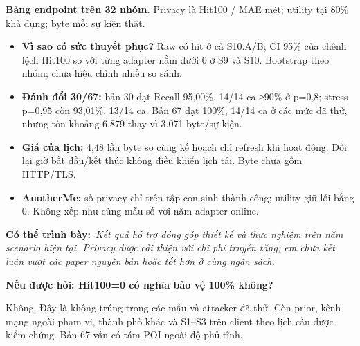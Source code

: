 \documentclass[10pt,a4paper]{article}
\newcommand{\say}[1]{\par\textbf{Có thể trình bày:}\ \textit{#1}\par}
\newcommand{\ask}[2]{\par\textbf{Nếu được hỏi: #1}\par #2\par}
\begin{document}
\textbf{Bảng endpoint trên 32 nhóm.} Privacy là Hit100 / MAE mét; utility tại 80\% khả dụng; byte mỗi sự kiện thật.
\EndpointEvidence
\begin{itemize}
\item \textbf{Vì sao có sức thuyết phục?} Raw có hit ở cả S10.A/B; CI 95\% của chênh lệch Hit100 so với từng adapter nằm dưới 0 ở S9 và S10. Bootstrap theo nhóm; chưa hiệu chỉnh nhiều so sánh.
\item \textbf{Đánh đổi 30/67:} bản 30 đạt Recall 95,00\%, 14/14 ca ≥90\% ở p=0,8; stress p=0,95 còn 93,01\%, 13/14 ca. Bản 67 đạt 100\%, 14/14 ca ở các mức đã thử, nhưng tốn khoảng 6.879 thay vì 3.071 byte/sự kiện.
\item \textbf{Giá của lịch:} 4,48 lần byte so cùng kế hoạch chỉ refresh khi hoạt động. Đổi lại giờ bắt đầu/kết thúc không điều khiển lịch tải. Byte chưa gồm HTTP/TLS.
\item \textbf{AnotherMe:} số privacy chỉ trên tập con sinh thành công; utility giữ lỗi bằng 0. Không xếp như cùng mẫu số với năm adapter online.
\end{itemize}
\say{Kết quả hỗ trợ đóng góp thiết kế và thực nghiệm trên năm scenario hiện tại. Privacy được cải thiện với chi phí truyền tăng; em chưa kết luận vượt các paper nguyên bản hoặc tốt hơn ở cùng ngân sách.}
\ask{Hit100=0 có nghĩa bảo vệ 100\% không?}{Không. Đây là không trúng trong các mẫu và attacker đã thử. Còn prior, kênh mạng ngoài phạm vi, thành phố khác và S1–S3 trên client theo lịch cần được kiểm chứng. Bản 67 vẫn có tám POI ngoài độ phủ tĩnh.}

\clearpage

\end{document}
